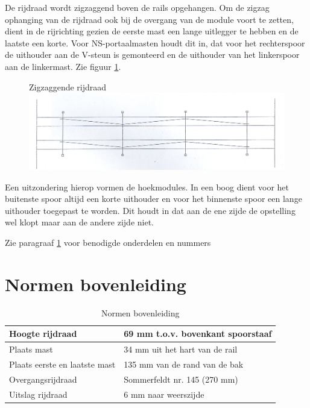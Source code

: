 \documentclass[12pt,a4paper]{report}
\begin{document}
De rijdraad wordt zigzaggend boven de rails opgehangen. Om de zigzag ophanging van de rijdraad ook bij de overgang van de module voort te zetten, dient in de rijrichting gezien de eerste mast een lange uitlegger te hebben en de laatste een korte. Voor NS-portaalmasten houdt dit in, dat voor het rechterspoor de uithouder aan de V-steun is gemonteerd en de uithouder van het linkerspoor aan de linkermast. Zie figuur \ref{figuur10}.

\begin{figure}[!ht]
  \captionbox
  {Zigzaggende rijdraad\label{figuur10}}
  {\includegraphics[scale=1.0]{images/rcu_figuur10}}
\end{figure}

Een uitzondering hierop vormen de hoekmodules. In een boog dient voor het buitenste spoor altijd een korte uithouder en voor het binnenste spoor een lange uithouder toegepast te worden. Dit houdt in dat aan de ene zijde de opstelling wel klopt maar aan de andere zijde niet.

Zie paragraaf \ref{ch:normen_bovenleiding} voor benodigde onderdelen en nummers

\section{Normen bovenleiding}
\label{ch:normen_bovenleiding}

\begin{table}[!ht]
\begin{tabular}{| l | l |}
\hline
\cellcolor[gray]{0.84}Hoogte rijdraad&69 mm t.o.v. bovenkant spoorstaaf\\
\hline
\cellcolor[gray]{0.84}Plaats mast&34 mm uit het hart van de rail\\
\hline
\cellcolor[gray]{0.84}Plaats eerste en laatste mast&135 mm van de rand van de bak\\
\hline
\cellcolor[gray]{0.84}Overgangsrijdraad&Sommerfeldt nr. 145 (270 mm)\\
\hline
\cellcolor[gray]{0.84}Uitslag rijdraad&6 mm naar weerszijde\\
\hline
\end{tabular}
\caption{Normen bovenleiding}
\end{table}
\end{document}
